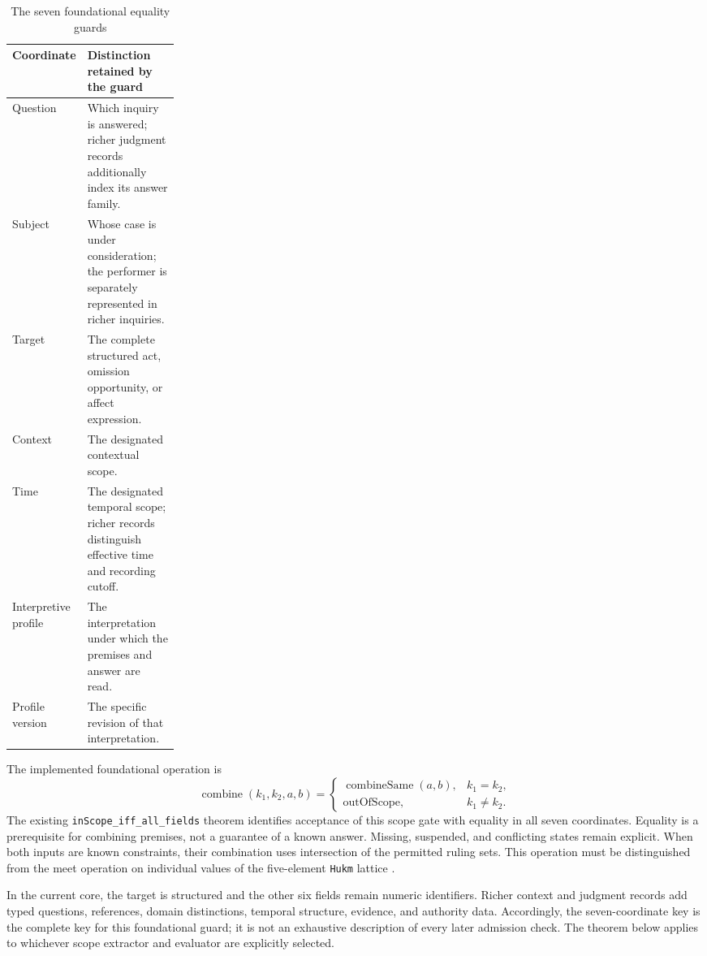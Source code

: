 \documentclass[11pt]{article}
\newcommand{\op}[1]{\operatorname{#1}}
\begin{document}
\begin{table}[htbp]
\centering\small
\caption{The seven foundational equality guards}
\begin{tabularx}{\linewidth}{@{}p{0.24\linewidth}Y@{}}
\toprule
Coordinate & Distinction retained by the guard \\
\midrule
Question & Which inquiry is answered; richer judgment records additionally index its answer family. \\
Subject & Whose case is under consideration; the performer is separately represented in richer inquiries. \\
Target & The complete structured act, omission opportunity, or affect expression. \\
Context & The designated contextual scope. \\
Time & The designated temporal scope; richer records distinguish effective time and recording cutoff. \\
Interpretive profile & The interpretation under which the premises and answer are read. \\
Profile version & The specific revision of that interpretation. \\
\bottomrule
\end{tabularx}
\end{table}

The implemented foundational operation is
\[
\op{combine}(k_1,k_2,a,b)=
\begin{cases}
\op{combineSame}(a,b),&k_1=k_2,\\
\mathrm{outOfScope},&k_1\ne k_2.
\end{cases}
\]
The existing \texttt{inScope\_iff\_all\_fields} theorem identifies acceptance of this scope gate with equality in all seven coordinates. Equality is a prerequisite for combining premises, not a guarantee of a known answer. Missing, suspended, and conflicting states remain explicit. When both inputs are known constraints, their combination uses intersection of the permitted ruling sets. This operation must be distinguished from the meet operation on individual values of the five-element \texttt{Hukm} lattice \cite{core}.

In the current core, the target is structured and the other six fields remain numeric identifiers. Richer context and judgment records add typed questions, references, domain distinctions, temporal structure, evidence, and authority data. Accordingly, the seven-coordinate key is the complete key for this foundational guard; it is not an exhaustive description of every later admission check. The theorem below applies to whichever scope extractor and evaluator are explicitly selected.
\end{document}
